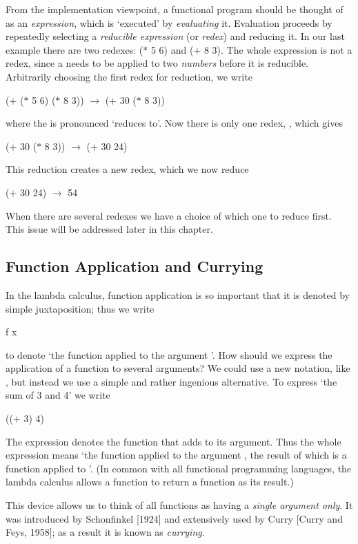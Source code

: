 From the implementation viewpoint, a functional program should be
thought of as an \textit{expression}, which is `executed' by \textit{evaluating} it. Evaluation
proceeds by repeatedly selecting a \textit{reducible expression} (or \textit{redex}) and
reducing it. In our last example there are two redexes: ($*$ 5 6) and ($+$ 8 3).
The whole expression  is not a redex, since a \ml{+} needs to be
applied to two \textit{numbers} before it is reducible. Arbitrarily choosing the first
redex for reduction, we write
\begin{mlcoded}
($+$ ($*$ 5 6) ($*$ 8 3)) $\to$ ($+$ 30 ($*$ 8 3))
\end{mlcoded}
where the \ml{$\to$} is pronounced `reduces to'. Now there is only one redex, ,
which gives
\begin{mlcoded}
($+$ 30 ($*$ 8 3)) $\to$ ($+$ 30 24)
\end{mlcoded}
This reduction creates a new redex, which we now reduce
\begin{mlcoded}
($+$ 30 24) $\to$ 54
\end{mlcoded}
\indent When there are several redexes we have a choice of which one to reduce
first. This issue will be addressed later in this chapter.

\subsection{Function Application and Currying}
In the lambda calculus, function application is so important that it is denoted
by simple juxtaposition; thus we write
\begin{mlcoded}
f x
\end{mlcoded}
to denote `the function  applied to the argument '. How should we express
the application of a function to several arguments? We could use a new
notation, like , but instead we use a simple and rather ingenious
alternative. To express `the sum of 3 and 4' we write
\begin{mlcoded}
	(($+$ 3) 4)
\end{mlcoded}
The expression  denotes the function that adds  to its argument. Thus
the whole expression means `the function \ml{+} applied to the argument , the
result of which is a function applied to '. (In common with all functional
programming languages, the lambda calculus allows a function to return a
function as its result.)

This device allows us to think of all functions as having a \textit{single argument
only}. It was introduced by Schonfinkel [1924] and extensively used by Curry
[Curry and Feys, 1958]; as a result it is known as \textit{currying}.

